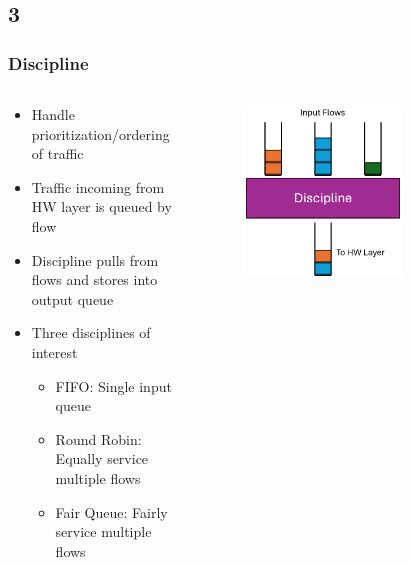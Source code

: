 \documentclass[compress]{beamer}
\begin{document}
    \subsection{3}
    \begin{frame}
        \frametitle{Discipline}
        \begin{columns}
            \begin{column}{0.5\textwidth}
                \begin{itemize}
                    \item Handle prioritization/ordering of traffic
                    \item Traffic incoming from HW layer is queued by flow
                    \item Discipline pulls from flows and stores into output queue
                    \item Three disciplines of interest
                    \begin{itemize}
                        \item FIFO: Single input queue
                        \item Round Robin: Equally service multiple flows
                        \item Fair Queue: Fairly service multiple flows
                    \end{itemize}
                \end{itemize}
            \end{column}

            \begin{column}{0.5\textwidth}
                \begin{figure}
                    \centering
                    \includegraphics[width=0.7\textwidth]{../img/discipline}
                \end{figure}
            \end{column}
        \end{columns}
    \end{frame}
\end{document}
